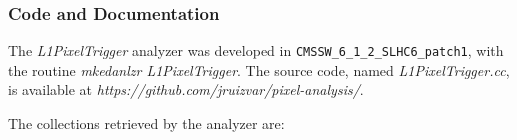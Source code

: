\documentclass[a4paper,12pt,oneside]{article}
\begin{document}
                   \subsubsection{Code and Documentation}


                   The \textit{L1PixelTrigger} analyzer was developed in \texttt{CMSSW\_6\_1\_2\_SLHC6\_patch1}, with the routine {\it mkedanlzr L1PixelTrigger}. The source code, named {\it L1PixelTrigger.cc}, is available at 
{\it https://github.com/jruizvar/pixel-analysis/}. 

The collections retrieved by the analyzer are:
\end{document}
